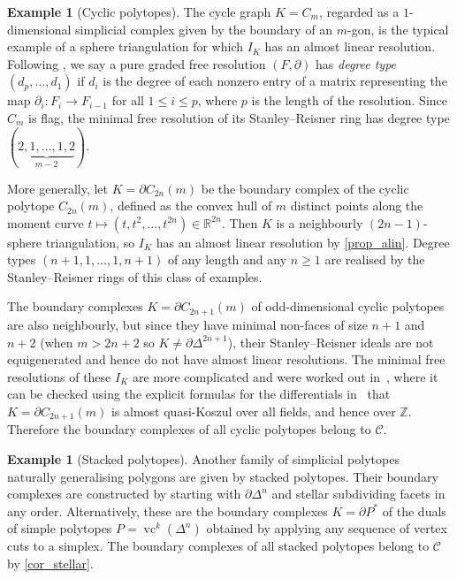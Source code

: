 \documentclass[a4paper,10pt]{amsart}
\theoremstyle{definition}
\newtheorem{example}[theorem]{Example}
\theoremstyle{remark}
\begin{document}
\begin{example}[Cyclic polytopes] \label{ex_cyclic}
The cycle graph $K=C_m$, regarded as a $1$-dimensional simplicial complex given by the boundary of an $m$-gon, is the typical example of a sphere triangulation for which $I_K$ has an almost linear resolution. Following \cite{BH}, we say a pure graded free resolution $(F,\partial)$ has \emph{degree type} $(d_p,\ldots,d_1)$ if $d_i$ is the degree of each nonzero entry of a matrix representing the map $\partial_i\colon F_i\to F_{i-1}$ for all $1\leqslant i\leqslant p$, where $p$ is the length of the resolution. Since $C_m$ is flag, the minimal free resolution of its Stanley--Reisner ring has degree type $(\underbrace{2,1,\ldots,1,2}_{m-2})$. 

More generally, let $K=\partial C_{2n}(m)$ be the boundary complex of the cyclic polytope $C_{2n}(m)$, defined as the convex hull of $m$ distinct points along the moment curve $t\mapsto (t,t^2,\ldots,t^{2n}) \in \mathbb{R}^{2n}$. Then $K$ is a neighbourly $(2n-1)$-sphere triangulation, so $I_K$ has an almost linear resolution by \cref{prop_alin}. Degree types $(n+1,1,\ldots,1,n+1)$ of any length and any $n\geqslant 1$ are realised by the Stanley--Reisner rings of this class of examples. 

The boundary complexes $K=\partial C_{2n+1}(m)$ of odd-dimensional cyclic polytopes are also neighbourly, but since they have minimal non-faces of size $n+1$ and $n+2$ (when $m>2n+2$ so $K\neq\partial\Delta^{2n+1}$), their Stanley--Reisner ideals are not equigenerated and hence do not have almost linear resolutions. The minimal free resolutions of these $I_K$ are more complicated and were worked out in~\cite{BoP}, where it can be checked using the explicit formulas for the differentials in~\cite[Section~2]{BoP} that $K=\partial C_{2n+1}(m)$ is almost quasi-Koszul over all fields, and hence over $\mathbb{Z}$. Therefore the boundary complexes of all cyclic polytopes belong to $\mathcal{C}$.
\end{example}

\begin{example}[Stacked polytopes] \label{ex_stacked}
Another family of simplicial polytopes naturally generalising polygons are given by stacked polytopes. Their boundary complexes are constructed by starting with $\partial\Delta^n$ and stellar subdividing facets in any order. Alternatively, these are the boundary complexes $K=\partial P^*$ of the duals of simple polytopes $P=\operatorname{vc}^k(\Delta^n)$ obtained by applying any sequence of vertex cuts to a simplex. The boundary complexes of all stacked polytopes belong to $\mathcal{C}$ by \cref{cor_stellar}.
\end{example}
\end{document}
